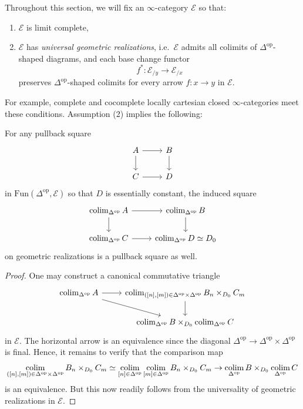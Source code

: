 \documentclass[a4paper, 11pt]{amsart}
\numberwithin{theorem}{section}
\theoremstyle{definition}
\newcommand{\op}{\mathrm{op}}
\def\colim{\qopname\relax m{colim}}
\newcommand{\fun}{\mathrm{Fun}}
\newcommand{\E}{\mathscr{E}}
\begin{document}
Throughout this section, we will fix an $\infty$-category $\E$ 
so that: 
\begin{enumerate}[noitemsep]
	\item $\E$ is limit complete,
	\item $\E$ has \textit{universal geometric realizations}, i.e.\ $\E$ admits all colimits 
	of $\Delta^\op$-shaped diagrams, and
	 each base change functor 
	$$
	f^* : \E_{/y} \rightarrow \E_{/x}
	$$
	preserves $\Delta^\op$-shaped colimits for every arrow $f : x\rightarrow y$ in $\E$.
\end{enumerate}
\noindent 
For example, complete and cocomplete locally cartesian closed $\infty$-categories meet these conditions. Assumption (2) implies the following:

\begin{lemma}\label{lem.geom-fib-prod-compatible}
	For any pullback square
	\[
		\begin{tikzcd}
			A \arrow[r]\arrow[d] & B\arrow[d] \\
			C \arrow[r] & D
		\end{tikzcd}
	\]
	in $\fun(\Delta^\op, \E)$ so that  $D$ is essentially constant, the induced square 
	\[
		\begin{tikzcd}
			\colim_{\Delta^\op} A \arrow[r]\arrow[d] & \colim_{\Delta^\op} B\arrow[d] \\
			\colim_{\Delta^\op} C \arrow[r] & \colim_{\Delta^\op} D \simeq D_0
		\end{tikzcd}
	\]
	on geometric realizations is a pullback square as well.
\end{lemma}
\begin{proof}
One may construct a canonical commutative triangle
\[
	\begin{tikzcd}
		\colim_{\Delta^\op} A \arrow[r]\arrow[dr] & \colim_{([n],[m])\in \Delta^\op \times \Delta^\op}B_n \times_{D_0} C_m \arrow[d] \\
		 & \colim_{\Delta^\op} B \times_{D_0} \colim_{\Delta^\op} C
	\end{tikzcd}
\]
in $\E$. The horizontal arrow is an equivalence since the diagonal $\Delta^\op \rightarrow \Delta^\op \times \Delta^\op$ is final. Hence, 
it remains to verify that the comparison map
$$
\colim_{([n],[m])\in \Delta^\op \times \Delta^\op}B_n \times_{D_0} C_m \simeq \colim_{[n] \in \Delta^\op} \colim_{[m]\in \Delta^\op} B_n \times_{D_0} C_m \rightarrow \colim_{\Delta^\op} B \times_{D_0} \colim_{\Delta^\op} C
$$
is an equivalence. But this now readily follows from the universality of geometric realizations in $\E$.
\end{proof}
\end{document}
